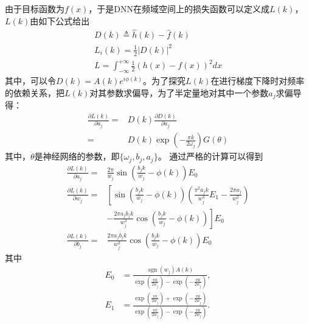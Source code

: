 由于目标函数为$f(x)$，于是DNN在频域空间上的损失函数可以定义成$L(k)$，$L(k)$由如下公式给出
\begin{equation}
\begin{array}{l}  
  D(k)\triangleq\hat{h}(k)-\hat{f}(k)  \\  
  L_i(k)=\frac{1}{2}\left|D(k)\right|^{2}  \\  
  L=\int_{-\infty}^{+\infty}\frac{1}{2}(h(x)-f(x))^{2}dx
\end{array} 
\end{equation}
其中，可以令$D(k)=A(k)e^{i\phi (k)}$。为了探究$L(k)$在进行梯度下降时对频率的依赖关系，把$L(k)$对其参数求偏导，为了半定量地对其中一个参数$a_j$求偏导得：
\begin{equation}
    \begin{aligned}
\frac{\partial L(k)}{\partial a_{j}}= & D(k)\frac{\partial D(k)}{\partial a_j} \\
=& D(k)\exp(-\frac{\pi k}{2\omega_j})G(\theta)\label{cucao}
\end{aligned}
\end{equation}
其中，$\theta$是神经网络的参数，即$\{\omega_j,b_j,a_j\}$。
通过严格的计算可以得到
\begin{equation}
    \begin{aligned}
\frac{\partial L(k)}{\partial a_{j}}= & \frac{2 \pi}{w_{j}} \sin \left(\frac{b_{j} k}{w_{j}}-\phi(k)\right) E_{0} \\
\frac{\partial L(k)}{\partial w_{j}}= & {\left[\sin \left(\frac{b_{j} k}{w_{j}}-\phi(k)\right)\left(\frac{\pi^{2} a_{j} k}{w_{j}^{3}} E_{1}-\frac{2 \pi a_{j}}{w_{j}^{2}}\right)\right.} \\
& \left.-\frac{2 \pi a_{j} b_{j} k}{w_{j}^{3}} \cos \left(\frac{b_{j} k}{w_{j}}-\phi(k)\right)\right] E_{0} \\
\frac{\partial L(k)}{\partial b_{j}}= & \frac{2 \pi a_{j} b_{j} k}{w_{j}^{2}} \cos \left(\frac{b_{j} k}{w_{j}}-\phi(k)\right) E_{0}
\end{aligned}
\end{equation}
其中
\begin{equation*}
    \begin{aligned}
E_{0} & =\frac{\operatorname{sgn}\left(w_{j}\right) A(k)}{\exp \left(\frac{\pi k}{2 w_{j}}\right)-\exp \left(-\frac{\pi k}{2 w_{j}}\right)}, \\
E_{1} & =\frac{\exp \left(\frac{\pi k}{2 w_{j}}\right)+\exp \left(-\frac{\pi k}{2 w_{j}}\right)}{\exp \left(\frac{\pi k}{2 w_{j}}\right)-\exp \left(-\frac{\pi k}{2 w_{j}}\right)} .
\end{aligned}
\end{equation*}

